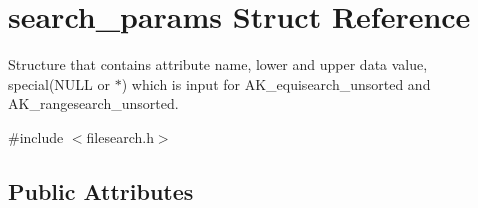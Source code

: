 \hypertarget{structsearch__params}{}\section{search\+\_\+params Struct Reference}
\label{structsearch__params}


Structure that contains attribute name, lower and upper data value, special(\+N\+U\+L\+L or $\ast$) which is input for A\+K\+\_\+equisearch\+\_\+unsorted and A\+K\+\_\+rangesearch\+\_\+unsorted.  




{\ttfamily \#include $<$filesearch.\+h$>$}

\subsection*{Public Attributes}
